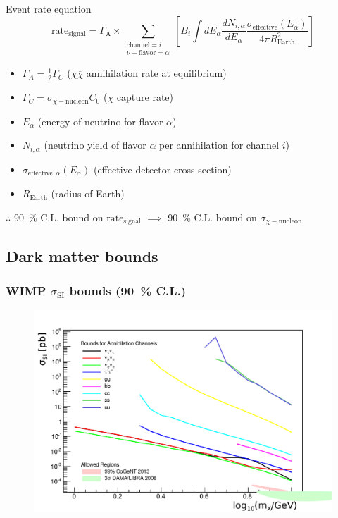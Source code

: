 \documentclass{beamer}
\begin{document}
\begin{frame}[t]{Event rate equation}
	\begin{equation*}
		\mathrm{rate}_{\mathrm{signal}} = \Gamma_{\mathrm{A}} \times
		\sum\limits_{\substack{\mathrm{channel} = i\\ \nu-\mathrm{flavor}= \alpha}}
		\left[
			B_{i} \int dE_{\alpha} \frac{dN_{i,\alpha}}{dE_{\alpha}}
			\frac{\sigma_{\mathrm{effective}}(E_{\alpha})}
			{4\pi R_{\mathrm{Earth}}^2}
		\right]
	\end{equation*}
	\begin{itemize}
		\item $\Gamma_{A} = \frac{1}{2}\Gamma_{C}$ ($\chi \overline{\chi}$
			annihilation rate at equilibrium)
		\item $\Gamma_{C} = \sigma_{\chi-\mathrm{nucleon}} C_{0}$ ($\chi$ capture rate)
		\item $E_{\alpha}$ (energy of neutrino for flavor $\alpha$)
		\item $N_{i,\alpha}$ (neutrino yield of flavor $\alpha$ per
			annihilation for channel $i$)
		\item $\sigma_{\mathrm{effective},\alpha}(E_{\alpha})$ (effective
			detector cross-section)
		\item $R_{\mathrm{Earth}}$ (radius of Earth)
	\end{itemize}
	$\therefore$ \SI{90}{\percent} C.L. bound on $\mathrm{rate}_{\mathrm{signal}}$
	$\implies$ \SI{90}{\percent} C.L. bound on $\sigma_{\chi-\mathrm{nucleon}}$
\end{frame}

\subsection{Dark matter bounds}
\begin{frame}
	\frametitle{WIMP $\sigma_{\mathrm{SI}}$ bounds (\SI{90}{\percent} C.L.)}
	\begin{figure}
		\centering
		\includegraphics[width=0.85\linewidth]{dmXSec_vs_log10mx.pdf}
	\end{figure}
\end{frame}
\end{document}
